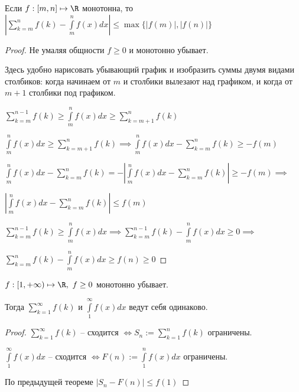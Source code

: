\newpage
{}

\begin{theorem} \thmslashn 

	Если $f : [m, n] \mapsto \R$ монотонна, то $|\sum\limits_{k=m}^{n} f(k) - \int\limits_{m}^{n} f(x)dx| \le \max\{|f(m)|, |f(n)|\} $
	
	\begin{proof} \thmslashn
    
        Не умаляя общности $f \ge 0$ и монотонно убывает.
        
        Здесь удобно нарисовать убывающий график и изобразить суммы двумя видами столбиков: когда начинаем от $m$ и столбики вылезают над графиком, и когда от $m+1$ столбики под графиком.
        
        $\sum\limits_{k=m}^{n-1} f(k) \ge \int\limits_{m}^{n} f(x)dx \ge \sum\limits_{k=m+1}^{n} f(k)$
        
        $\int\limits_{m}^{n} f(x)dx \ge \sum\limits_{k=m+1}^{n} f(k) \implies \int\limits_{m}^{n} f(x)dx - \sum\limits_{k=m}^{n} f(k) \ge -f(m)$
        
        $\int\limits_{m}^{n} f(x)dx - \sum\limits_{k=m}^{n} f(k) = -|\int\limits_{m}^{n} f(x)dx - \sum\limits_{k=m}^{n} f(k)| \ge -f(m) \implies$ 
        
        $|\int\limits_{m}^{n} f(x)dx - \sum\limits_{k=m}^{n} f(k)| \le f(m)$
        
        $\sum\limits_{k=m}^{n-1} f(k) \ge \int\limits_{m}^{n} f(x)dx \implies \sum\limits_{k=m}^{n-1} f(k) - \int\limits_{m}^{n} f(x)dx \ge 0 \implies$
        
        $\sum\limits_{k=m}^{n} f(k) - \int\limits_{m}^{n} f(x)dx \ge f(n) \ge 0$

    \end{proof}

\end{theorem}

\begin{theorem} \thmslashn 

    $f : [1, +\infty) \mapsto \R, ~ f \ge 0$ монотонно убывает.
    
    Тогда $\sum\limits_{k=1}^{\infty} f(k)$ и $\int\limits_{1}^{\infty} f(x)dx$ ведут себя одинаково.

	\begin{proof} \thmslashn
	
	    $\sum\limits_{k=1}^{\infty} f(k)$ -- сходится $\iff S_n := \sum\limits_{k=1}^{n} f(k)$ ограничены.
	    
	    $\int\limits_{1}^{\infty} f(x)dx$ -- сходится $\iff F(n) := \int\limits_{1}^{n} f(x)dx$ ограничены.
	    
	    По предыдущей теореме $|S_n - F(n)| \le f(1)$
	    
    \end{proof}

\end{theorem}

